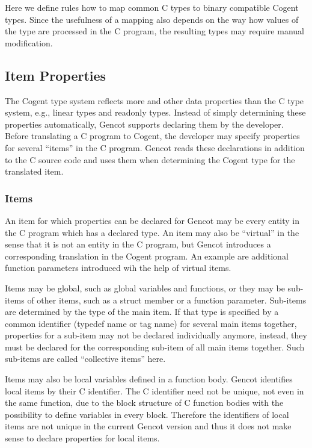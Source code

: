 
Here we define rules how to map common C types to binary compatible Cogent types. Since the usefulness of a mapping
also depends on the way how values of the type are processed in the C program, the resulting types may require manual 
modification.

\subsection{Item Properties}
\label{design-types-itemprops}

The Cogent type system reflects more and other data properties than the C type system, e.g., linear types
and readonly types. Instead of simply determining these properties automatically, Gencot supports declaring 
them by the developer. Before translating a C program to Cogent, the developer may specify properties
for several ``items'' in the C program. Gencot reads these declarations in addition to the C source code
and uses them when determining the Cogent type for the translated item.

\subsubsection{Items}

An item for which properties can be declared for Gencot may be every entity in the C program which has a declared type.
An item may also be ``virtual'' in the sense that it is not an entity in the C program, but Gencot introduces 
a corresponding translation in the Cogent program. An example are additional function parameters introduced 
wih the help of virtual items.

Items may be global, such as global variables and functions, or they may be sub-items of other items, such as a
struct member or a function parameter. Sub-items are determined by the type of the main item. If that type is
specified by a common identifier (typedef name or tag name) for several main items together, properties for
a sub-item may not be declared individually anymore, instead, they must be declared for the corresponding sub-item
of all main items together. Such sub-items are called ``collective items'' here.

Items may also be local variables defined in a function body. Gencot identifies local items by their C identifier.
The C identifier need not be unique, not even in the same function, due to the block structure of C function bodies
with the possibility to define variables in every block. Therefore the identifiers of local items are not 
unique in the current Gencot version and thus it does not make sense to declare properties for local items. 

